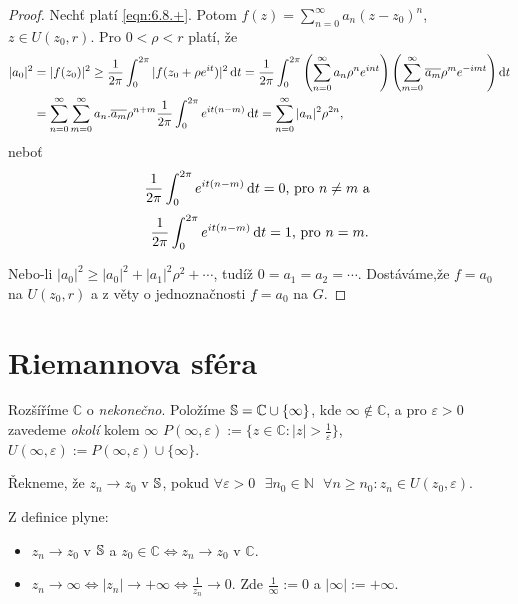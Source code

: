 \begin{proof}
Nechť platí \cref{eqn:6.8.+}. Potom $f(z)=\sum\limits_{n=0}^\infty a_n(z-z_0)^{n}$, $z\in U(z_0,r)$. Pro $0<\rho<r$ platí, že 
\begin{equation}
    \begin{aligned}
    |a_0|^2 &=
    |f(z_0)|^2 \geq 
    \frac{1}{2 \pi} \int_{0}^{2 \pi} |f(z_0+\rho e^{it})|^2 \mathop{}\!\mathrm{d} t =
    \frac{1}{2\pi} \int_{0}^{2 \pi} \left(\sum\limits_{n=0}^\infty a_n \rho^n e^{int}\right)\left(\sum\limits_{m=0}^\infty \overline{a_m} \rho^m e^{-imt}\right) \mathop{}\!\mathrm{d} t  \\
    & = \sum\limits_{n=0}^\infty \sum\limits_{m=0}^\infty a_n. \overline{a_m} \rho^{n+m} \frac{1}{2 \pi} \int_{0}^{2 \pi}  e^{it(n-m)} \mathop{}\!\mathrm{d} t=\sum\limits_{n=0}^\infty |a_n|^2\rho^{2n},
    \end{aligned}
\end{equation}
 neboť $$\frac{1}{2 \pi} \int_{0}^{2 \pi}  e^{it(n-m)} \mathop{}\!\mathrm{d} t = 0 \text{,  pro  } n\neq m \text{ a }$$ 
 $$\frac{1}{2 \pi} \int_{0}^{2 \pi}  e^{it(n-m)} \mathop{}\!\mathrm{d} t=1 \text{, pro } n=m.$$


Nebo-li $|a_0|^2\geq|a_0|^2+|a_1|^2\rho^2+\cdots$, tudíž $0=a_1=a_2=\cdots$. Dostáváme,že $f=a_0$ na $U(z_0,r)$ a z věty o jednoznačnosti $f=a_0$ na $G$.
\end{proof}

\section{\texorpdfstring{Riemannova sféra}{Riemannova sféra}}
Rozšíříme $\mathbb{C}$ o \emph{nekonečno}.
Položíme $\operatorname{\mathbb{S}}=\mathbb{C}\cup\{\infty\}$, kde $\infty\notin\mathbb{C}$, a pro $\varepsilon>0$ zavedeme \emph{okolí} kolem $\infty$ $P(\infty,\varepsilon):=\{z\in\mathbb{C}: |z|>\frac{1}{\varepsilon}\}$,
$U(\infty,\varepsilon):=P(\infty,\varepsilon)\cup \{\infty\}$.

\begin{definition}
Řekneme, že $z_n\rightarrow z_0$ v $\operatorname{\mathbb{S}}$, pokud $\forall\varepsilon>0\textbf{ }  \exists n_0\in\mathbb{N}\textbf{ }\forall n\geq n_0:z_n\in U(z_0,\varepsilon)$.
\end{definition}

\begin{note} Z definice plyne:
\begin{itemize}
    \item $z_n\rightarrow z_0$ v $\operatorname{\mathbb{S}}$ a $z_0\in\mathbb{C}\Leftrightarrow z_n\rightarrow z_0$ v $\mathbb{C}$.
    \item $z_n\rightarrow\infty\Leftrightarrow|z_n|\rightarrow+\infty\Leftrightarrow\frac{1}{z_n}\rightarrow 0$. Zde $\frac{1}{\infty}:=0$ a $|\infty|:=+\infty$.
\end{itemize}
\end{note}

